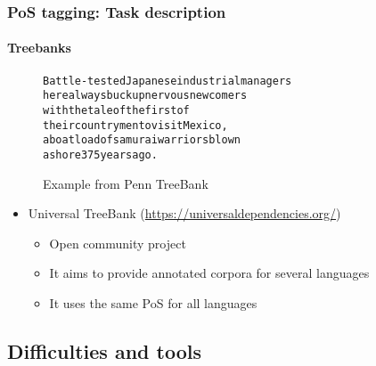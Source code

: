 \documentclass[xcolor=table]{beamer}
\begin{document}
\begin{frame}[fragile]
\frametitle{PoS tagging: Task description}
\framesubtitle{Treebanks}


\begin{figure}
	\begin{tcolorbox}[colback=white, colframe=blue, boxrule=1pt, text width=.9\textwidth]
		\small
\begin{alltt}
Battle-tested Japanese industrial managers
here always buck up nervous newcomers
with the tale of the first of
their countrymen to visit Mexico ,\keyword{/,}
a boatload of samurai warriors blown
ashore 375 years ago .
\end{alltt}
\end{tcolorbox}
\caption{Example from Penn TreeBank \cite{2003-taylor}}
\end{figure}

\begin{itemize}
	\item Universal TreeBank (\url{https://universaldependencies.org/}) \cite{2012-petrov-al}
	\begin{itemize}
		\item Open community project
		\item It aims to provide annotated corpora for several languages
		\item It uses the same PoS for all languages
	\end{itemize}
\end{itemize}

\end{frame}

\subsection{Difficulties and tools}
\end{document}
